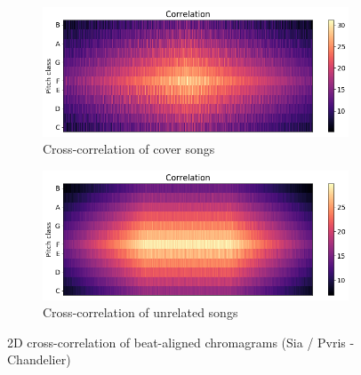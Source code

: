 \begin{figure}[htbp]
{{			\begin{subfigure}{.495\textwidth}
				\centering    
				\includegraphics[scale=0.3]{Images/Chroma/cross_hurricane.png}
				\caption{Cross-correlation of cover songs}
				\label{cc1}
			\end{subfigure}		
			\begin{subfigure}{.495\textwidth}
				\centering     
				\includegraphics[scale=0.3]{Images/Chroma/cross_hurricane_sia.png}
				\caption{Cross-correlation of unrelated songs}
				\label{cc2}
			\end{subfigure}%
	}}
	\caption{2D cross-correlation of beat-aligned chromagrams (Sia / Pvris - Chandelier)}
	\label{fig:crosscorr}
\end{figure}

